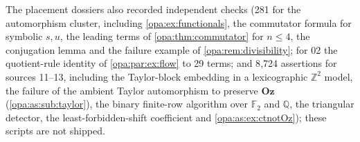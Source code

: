 \documentclass[11pt,oneside]{article}
\numberwithin{equation}{section}
\theoremstyle{definition}
\theoremstyle{remark}
\newcommand{\Oz}{\mathbf{Oz}}
\newcommand{\Q}{\mathbb Q}
\newcommand{\Z}{\mathbb Z}
\begin{document}
The placement dossiers also recorded independent checks (281 for the automorphism
cluster, including \cref{opa:ex:functionals}, the commutator formula for symbolic $s,u$,
the leading terms of \cref{opa:thm:commutator} for $n\le4$, the conjugation lemma and the
failure example of \cref{opa:rem:divisibility}; for 02 the quotient-rule identity of
\cref{opa:par:ex:flow} to 29 terms; and 8{,}724 assertions for sources 11--13, including
the Taylor-block embedding in a lexicographic $\Z^2$ model, the failure of the ambient
Taylor automorphism to preserve $\Oz$ (\cref{opa:as:sub:taylor}), the binary finite-row algorithm over $\mathbb F_2$ and
$\Q$, the triangular detector, the least-forbidden-shift coefficient and
\cref{opa:as:ex:ctnotOz}); these scripts are not shipped.

\clearpage
{}
{}
\end{document}
